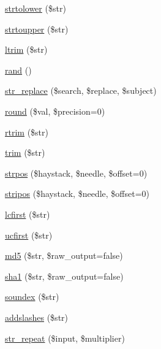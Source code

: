 \begin{DoxyCompactItemize}
\item 
\hyperlink{class_p_h_p_linq___adapter___abstract_a1b110623289b85debb6efaaff2bf722f}{strtolower} (\$str)
\item 
\hyperlink{class_p_h_p_linq___adapter___abstract_ac2db10a13d66809bc5c9bd26428cd833}{strtoupper} (\$str)
\item 
\hyperlink{class_p_h_p_linq___adapter___abstract_a36a0151237d3480734de64933f769843}{ltrim} (\$str)
\item 
\hyperlink{class_p_h_p_linq___adapter___abstract_a02d3f138418af75a9152e5378a946c40}{rand} ()
\item 
\hyperlink{class_p_h_p_linq___adapter___abstract_acf873c5fe629bc33732a0a2bc304f0f8}{str\-\_\-replace} (\$search, \$replace, \$subject)
\item 
\hyperlink{class_p_h_p_linq___adapter___abstract_aa9d8fa8127391960c54ee0c5a31e18a3}{round} (\$val, \$precision=0)
\item 
\hyperlink{class_p_h_p_linq___adapter___abstract_afa81b944f8aed770a266a9884e3e5049}{rtrim} (\$str)
\item 
\hyperlink{class_p_h_p_linq___adapter___abstract_a432e7b973a6e6bfa55cced21e75ee29e}{trim} (\$str)
\item 
\hyperlink{class_p_h_p_linq___adapter___abstract_a75b50139ee3829fbfd47af6805284786}{strpos} (\$haystack, \$needle, \$offset=0)
\item 
\hyperlink{class_p_h_p_linq___adapter___abstract_aa0297b92e96759a576d3aa8caa22b10d}{stripos} (\$haystack, \$needle, \$offset=0)
\item 
\hyperlink{class_p_h_p_linq___adapter___abstract_a30bdc1fd395302cfaeabd165adde41c9}{lcfirst} (\$str)
\item 
\hyperlink{class_p_h_p_linq___adapter___abstract_a7d8809b3fca65a75b2bd2ebbea5b3695}{ucfirst} (\$str)
\item 
\hyperlink{class_p_h_p_linq___adapter___abstract_ad89ffd1039629dc781704c405abc87a7}{md5} (\$str, \$raw\-\_\-output=false)
\item 
\hyperlink{class_p_h_p_linq___adapter___abstract_aeb44f0e1038759e5c086db848661f845}{sha1} (\$str, \$raw\-\_\-output=false)
\item 
\hyperlink{class_p_h_p_linq___adapter___abstract_a5d9e5163f9c4dfcf3b36a635c8ba5638}{soundex} (\$str)
\item 
\hyperlink{class_p_h_p_linq___adapter___abstract_aec7fed6f81c650fb3106e2f0eed11e03}{addslashes} (\$str)
\item 
\hyperlink{class_p_h_p_linq___adapter___abstract_a046ec25a1370781be01e1590d84aecf7}{str\-\_\-repeat} (\$input, \$multiplier)
\end{DoxyCompactItemize}

